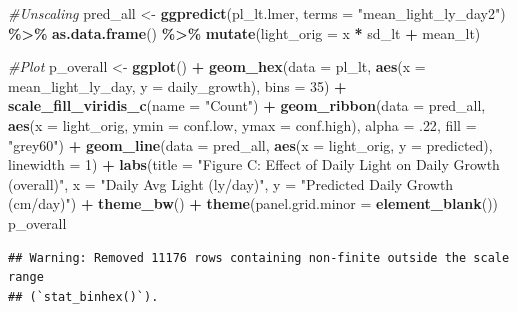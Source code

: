 \documentclass[
]{article}
\newenvironment{Shaded}{\begin{snugshade}}{\end{snugshade}}
\newcommand{\AttributeTok}[1]{\textcolor[rgb]{0.13,0.29,0.53}{#1}}
\newcommand{\CommentTok}[1]{\textcolor[rgb]{0.56,0.35,0.01}{\textit{#1}}}
\newcommand{\DecValTok}[1]{\textcolor[rgb]{0.00,0.00,0.81}{#1}}
\newcommand{\FunctionTok}[1]{\textcolor[rgb]{0.13,0.29,0.53}{\textbf{#1}}}
\newcommand{\NormalTok}[1]{#1}
\newcommand{\OtherTok}[1]{\textcolor[rgb]{0.56,0.35,0.01}{#1}}
\newcommand{\SpecialCharTok}[1]{\textcolor[rgb]{0.81,0.36,0.00}{\textbf{#1}}}
\newcommand{\StringTok}[1]{\textcolor[rgb]{0.31,0.60,0.02}{#1}}
\begin{document}
\begin{Shaded}
\begin{Highlighting}[]
\CommentTok{\#Unscaling}
\NormalTok{pred\_all }\OtherTok{\textless{}{-}} \FunctionTok{ggpredict}\NormalTok{(pl\_lt.lmer, }\AttributeTok{terms =} \StringTok{"mean\_light\_ly\_day2"}\NormalTok{) }\SpecialCharTok{\%\textgreater{}\%}
  \FunctionTok{as.data.frame}\NormalTok{() }\SpecialCharTok{\%\textgreater{}\%}
  \FunctionTok{mutate}\NormalTok{(}\AttributeTok{light\_orig =}\NormalTok{ x }\SpecialCharTok{*}\NormalTok{ sd\_lt }\SpecialCharTok{+}\NormalTok{ mean\_lt)}

\CommentTok{\#Plot}
\NormalTok{p\_overall }\OtherTok{\textless{}{-}} \FunctionTok{ggplot}\NormalTok{() }\SpecialCharTok{+}
  \FunctionTok{geom\_hex}\NormalTok{(}\AttributeTok{data =}\NormalTok{ pl\_lt,}
           \FunctionTok{aes}\NormalTok{(}\AttributeTok{x =}\NormalTok{ mean\_light\_ly\_day, }\AttributeTok{y =}\NormalTok{ daily\_growth), }\AttributeTok{bins =} \DecValTok{35}\NormalTok{) }\SpecialCharTok{+}
  \FunctionTok{scale\_fill\_viridis\_c}\NormalTok{(}\AttributeTok{name =} \StringTok{"Count"}\NormalTok{) }\SpecialCharTok{+}
  \FunctionTok{geom\_ribbon}\NormalTok{(}\AttributeTok{data =}\NormalTok{ pred\_all,}
              \FunctionTok{aes}\NormalTok{(}\AttributeTok{x =}\NormalTok{ light\_orig, }\AttributeTok{ymin =}\NormalTok{ conf.low, }\AttributeTok{ymax =}\NormalTok{ conf.high),}
              \AttributeTok{alpha =}\NormalTok{ .}\DecValTok{22}\NormalTok{, }\AttributeTok{fill =} \StringTok{"grey60"}\NormalTok{) }\SpecialCharTok{+}
  \FunctionTok{geom\_line}\NormalTok{(}\AttributeTok{data =}\NormalTok{ pred\_all,}
            \FunctionTok{aes}\NormalTok{(}\AttributeTok{x =}\NormalTok{ light\_orig, }\AttributeTok{y =}\NormalTok{ predicted), }\AttributeTok{linewidth =} \DecValTok{1}\NormalTok{) }\SpecialCharTok{+}
  \FunctionTok{labs}\NormalTok{(}\AttributeTok{title =} \StringTok{"Figure C: Effect of Daily Light on Daily Growth (overall)"}\NormalTok{,}
       \AttributeTok{x =} \StringTok{"Daily Avg Light (ly/day)"}\NormalTok{,}
       \AttributeTok{y =} \StringTok{"Predicted Daily Growth (cm/day)"}\NormalTok{) }\SpecialCharTok{+}
  \FunctionTok{theme\_bw}\NormalTok{() }\SpecialCharTok{+}
  \FunctionTok{theme}\NormalTok{(}\AttributeTok{panel.grid.minor =} \FunctionTok{element\_blank}\NormalTok{())}
\NormalTok{p\_overall}
\end{Highlighting}
\end{Shaded}

\begin{verbatim}
## Warning: Removed 11176 rows containing non-finite outside the scale range
## (`stat_binhex()`).
\end{verbatim}
\end{document}
